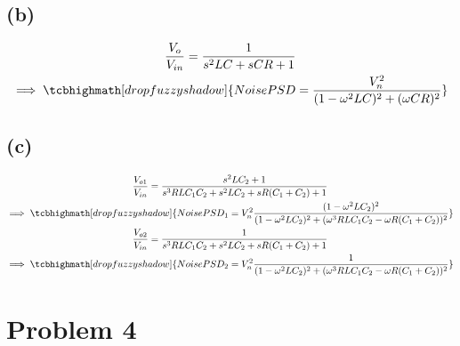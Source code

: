 \documentclass{article}
\begin{document}
\subsection*{(b)}
\begin{gather*}
	\frac{V_o}{V_{in}} = \frac{1}{s^2LC + sCR + 1}\\
	\implies \tcbhighmath[drop fuzzy shadow]{NoisePSD = \frac{V_n^2}{(1 - {\omega}^2 LC)^2 + (\omega CR)^2}}
\end{gather*}
\subsection*{(c)}
\begin{gather*}
	\frac{V_{o1}}{V_{in}} = \frac{s^2LC_2 + 1}{s^3RLC_1C_2 + s^2LC_2 + sR(C_1 + C_2) + 1}\\
	\implies \tcbhighmath[drop fuzzy shadow]{NoisePSD_1 = V_n^2\frac{(1 - {\omega}^2LC_2)^2}{(1 - {\omega}^2LC_2)^2 + ({\omega}^3RLC_1C_2 - {\omega}R(C_1 + C_2))^2}}\\
	\frac{V_{o2}}{V_{in}} = \frac{1}{s^3RLC_1C_2 + s^2LC_2 + sR(C_1 + C_2) + 1}\\
	\implies \tcbhighmath[drop fuzzy shadow]{NoisePSD_2 = V_n^2\frac{1}{(1 - {\omega}^2LC_2)^2 + ({\omega}^3RLC_1C_2 - {\omega}R(C_1 + C_2))^2}}\\
\end{gather*}
\section*{\hfil Problem 4}
\end{document}
